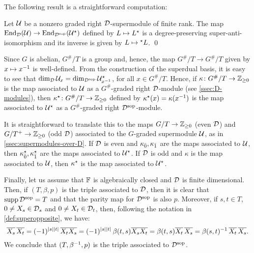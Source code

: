 The following result is a straightforward computation:

\begin{prop}\label{prop:dual-super-anti-iso}
    Let $\mathcal U$ be a nonzero graded right $\mathcal{D}$-supermodule of finite rank. 
    The map $\operatorname{End}_{\mathcal{D}} (\mathcal U) \rightarrow \operatorname{End}_{\mathcal{D}^{\mathrm{sop}}} (\mathcal U^\star)$ defined by $L \mapsto L^\star$ is a degree-preserving super-anti-isomorphism and its inverse is given by $L \mapsto {}^\star L$. \qed
\end{prop}

Since $G$ is abelian, $G^\#/T$ is a group and, hence, the map $G^\#/T \to G^\#/T$ given by $x \mapsto x^{-1}$ is well-defined. 
From the construction of the superdual basis, it is easy to see that $\dim_{\mathcal{D}} \mathcal U_x = \dim_{\mathcal{D}^{\mathrm{sop}}} \mathcal U^\star_{x^{-1}}$, for all $x \in G^\#/T$. 
Hence, if $\kappa\colon G^\#/T \to \mathbb{Z}_{\geq 0}$ is the map associated to $\mathcal U$ as a $G^\#$-graded right $\mathcal{D}$-module (see \cref{ssec:D-modules}), then $\kappa^\star \colon G^\#/T \to \mathbb{Z}_{\geq 0}$ defined by $\kappa^\star (x) = \kappa (x^{-1})$ is the map associated to $\mathcal U^\star$ as a $G^\#$-graded right $\mathcal{D}^{\mathrm{sop}}$-module.

It is straightforward to translate this to the maps $G/T \to \mathbb{Z}_{\geq 0}$ (even $\mathcal{D}$) and $G/T^+ \to \mathbb{Z}_{\geq 0}$ (odd $\mathcal{D}$) associated to the $G$-graded supermodule $\mathcal U$, as in \cref{ssec:supermodules-over-D}. 
If $\mathcal{D}$ is even and $\kappa_{\bar{0}}, \kappa_{\bar{1}}$ are the maps associated to $\mathcal U$, then $\kappa_{\bar{0}}^\star, \kappa_{\bar{1}}^\star$ are the maps associated to $\mathcal U^\star$. 
If $\mathcal{D}$ is odd and $\kappa$ is the map associated to $\mathcal U$, then $\kappa^\star$ is the map associated to $\mathcal U^\star$.

Finally, let us assume that $\mathbb{F}$ is algebraically closed and $\mathcal{D}$ is finite dimensional. 
Then, if $(T, \beta, p)$ is the triple associated to $\mathcal{D}$, then it is clear that $\operatorname{supp} \mathcal{D}^{\mathrm{sop}} = T$ and that the parity map for $\mathcal{D}^{\mathrm{sop}}$ is also $p$. 
Moreover, if $s,t \in T$, $0 \neq X_s \in \mathcal{D}_s$ and $0 \neq X_t \in \mathcal{D}_t$, then, following the notation in \cref{def:superopposite}, we have:
\[
    \overline{X_s} \, \overline{X_t} = (-1)^{|s||t|} \, \overline{X_tX_s} = (-1)^{|s||t|}\,  \beta(t, s) \overline{X_sX_t} = \beta(t, s) \overline{X_t} \, \overline{X_s} = \beta(s, t)^{-1} \, \overline{X_t} \, \overline{X_s}.
\]
We conclude that $(T,\beta^{-1}, p)$ is the triple associated to $\mathcal{D}^{\mathrm{sop}}$.